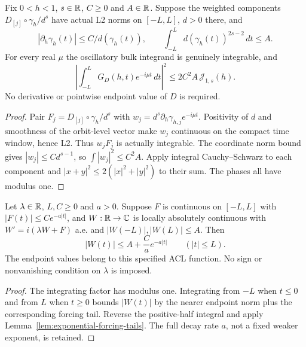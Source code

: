 \begin{lemma}
\label{lem:weighted-numerator-bulk}
\leanok
Fix $0<h<1$, $s\in\mathbb{R}$, $C\ge0$ and $A\in\mathbb{R}$.
Suppose the weighted components $D_{[j]}\circ\gamma_h/d^s$ have
actual L2 norms on $[-L,L]$, $d>0$ there, and
\[
 |\partial_h\gamma_h(t)|\le C/d(\gamma_h(t)),\qquad
 \int_{-L}^{L}d(\gamma_h(t))^{2s-2}\,dt\le A.
\]
For every real $\mu$ the oscillatory bulk integrand is genuinely integrable,
and
\[
 \left|\int_{-L}^{L}G_D(h,t)e^{-i\mu t}\,dt\right|^2
 \le 2C^2A\,\mathcal J_{1,s}(h).
\]
No derivative or pointwise endpoint value of $D$ is required.
\end{lemma}

\begin{proof}
\leanok
Pair $F_j=D_{[j]}\circ\gamma_h/d^s$ with
$w_j=d^s\partial_h\gamma_{h,j}e^{-i\mu t}$.
Positivity of $d$ and smoothness of the orbit-level vector make $w_j$
continuous on the compact time window, hence L2. Thus $w_jF_j$ is
actually integrable. The coordinate norm bound gives
$|w_j|\le Cd^{s-1}$, so $\int|w_j|^2\le C^2A$.
Apply integral Cauchy--Schwarz to each component and
$|x+y|^2\le2(|x|^2+|y|^2)$ to their sum. The phases all have modulus one.
\end{proof}

\begin{lemma}
\label{lem:transport-endpoint-exponential-decay}
\leanok
Let $\lambda\in\mathbb{R}$, $L,C\ge0$ and $a>0$.
Suppose $F$ is continuous on $[-L,L]$ with $|F(t)|\le Ce^{-a|t|}$,
and $W:\mathbb{R}\to\mathbb{C}$ is locally absolutely continuous with
$W'=i(\lambda W+F)$ a.e. and $|W(-L)|,|W(L)|\le A$.
Then
\[
 |W(t)|\le A+\frac Ca e^{-a|t|}\qquad(|t|\le L).
\]
The endpoint values belong to this specified ACL function.
No sign or nonvanishing condition on $\lambda$ is imposed.
\end{lemma}

\begin{proof}
\leanok
The integrating factor has modulus one. Integrating from $-L$ when $t\le0$
and from $L$ when $t\ge0$ bounds $|W(t)|$ by the nearer endpoint norm
plus the corresponding forcing tail.
Reverse the positive-half integral and apply
Lemma~\ref{lem:exponential-forcing-tails}.
The full decay rate $a$, not a fixed weaker exponent, is retained.
\end{proof}


